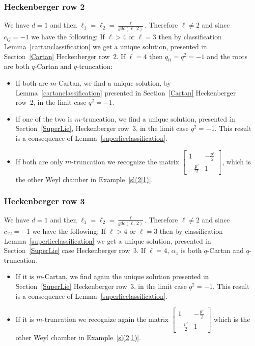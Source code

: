 \documentclass[pdftex]{sigma}%
\numberwithin{equation}{section}
\begin{document}
\subsubsection*{Heckenberger row 2}
We have $d=1$ and then $\ell_1 = \ell_2 = \frac{\ell}{gdc(\ell, 2)}$. Therefore $\ell \neq 2$ and since $c_{ij}=-1$ we have the following:
If $\ell > 4$ or $\ell=3$ then by classification Lemma~\ref{cartanclassification} we get a unique solution, presented in Section~\ref{Cartan} Heckenberger row~2.
If $\ell = 4$ then $q_{ii}=q^2= -1$ and the roots are both $q$-Cartan and $q$-truncation:
\begin{itemize}\itemsep=0pt
	\item If both are $m$-Cartan, we find a unique solution, by Lemma~\ref{cartanclassification} presented in Section~\ref{Cartan} Heckenberger row~2, in the limit case $q^2=-1$.
	\item If one of the two is $m$-truncation, we find a unique solution, presented in Section~\ref{SuperLie}, Heckenberger row~3, in the limit case $q^2 = -1$. This result is a consequence of Lemma~\ref{superlieclassification}.
	\item If both are only $m$-truncation we recognize the matrix
	$\left[\begin{smallmatrix}
 1 & -\frac{p'}{2}\\
 -\frac{p'}{2} & 1
\end{smallmatrix} \right]$, which is the other Weyl chamber in Example~\ref{sl(2|1)}.
\end{itemize}

\subsubsection*{Heckenberger row 3}
We have $d=1$ and then $\ell_1 = \ell_2 = \frac{\ell}{gdc(\ell, 2)}$. Therefore $\ell \neq 2$ and since $c_{12}=-1$ we have the following:
If $\ell > 4$ or $\ell=3$ then by classification Lemma~\ref{superlieclassification} we get a unique solution, presented in Section~\ref{SuperLie} case Heckenberger row~3.
If $\ell = 4$, $\alpha_1$ is both $q$-Cartan and $q$-truncation.
\begin{itemize}\itemsep=0pt
	\item If it is $m$-Cartan, we find again the unique solution presented in Section~\ref{SuperLie} Heckenberger row~3, in the limit case $q^2=-1$.
	This result is a consequence of Lemma~\ref{superlieclassification}.
	\item If it is $m$-truncation we recognize again the matrix $\left[\begin{smallmatrix}
 1 & -\frac{p'}{2}\\
 -\frac{p'}{2} & 1
\end{smallmatrix}\right] $ which is the other Weyl chamber in Example~\ref{sl(2|1)}.
\end{itemize}
\end{document}

